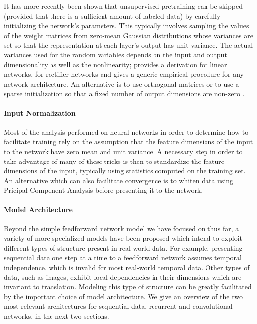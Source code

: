 It has more recently been shown that unsupervised pretraining can be skipped (provided that there is a sufficient amount of labeled data) by carefully initializing the network's parameters.
This typically involves sampling the values of the weight matrices from zero-mean Gaussian distributions whose variances are set so that the representation at each layer's output has unit variance.
The actual variances used for the random variables depends on the input and output dimensionality as well as the nonlinearity; \cite{} provides a derivation for linear networks, \cite{} for rectifier networks and \cite{} gives a generic empirical procedure for any network architecture.
An alternative is to use orthogonal matrices \cite{} or to use a sparse initialization so that a fixed number of output dimensions are non-zero \cite{}.


\paragraph{Input Normalization}

Most of the analysis performed on neural networks in order to determine how to facilitate training rely on the assumption that the feature dimensions of the input to the network have zero mean and unit variance.
A necessary step in order to take advantage of many of these tricks is then to standardize the feature dimensions of the input, typically using statistics computed on the training set.
An alternative which can also facilitate convergence is to whiten data using Pricipal Component Analysis before presenting it to the network.

\paragraph{Model Architecture}

Beyond the simple feedforward network model we have focused on thus far, a variety of more specialized models have been proposed which intend to exploit different types of structure present in real-world data.
For example, presenting sequential data one step at a time to a feedforward network assumes temporal independence, which is invalid for most real-world temporal data.
Other types of data, such as images, exhibit local dependencies in their dimensions which are invariant to translation.
Modeling this type of structure can be greatly facilitated by the important choice of model architecture.
We give an overview of the two most relevant architectures for sequential data, recurrent and convolutional networks, in the next two sections.

